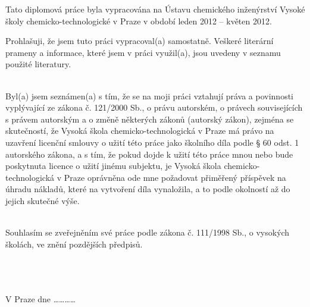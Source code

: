 \noindent Tato diplomová práce byla vypracována na Ústavu chemického inženýrství Vysoké školy chemicko-technologické v Praze v období leden 2012 -- květen 2012.

\vspace{11cm}
\noindent Prohlašuji, že jsem tuto práci vypracoval(a) samostatně. Veškeré literární prameny a informace, které jsem v práci využil(a), jsou uvedeny v seznamu použité literatury.

~\\
\noindent Byl(a) jsem seznámen(a) s tím, že se na moji práci vztahují práva a povinnosti vyplývající ze zákona č. 121/2000 Sb., o právu autorském, o právech souvisejících s právem autorským a o změně některých zákonů (autorský zákon), zejména se skutečností, že Vysoká škola chemicko-technologická v Praze má právo na uzavření licenční smlouvy o užití této práce jako školního díla podle § 60 odst. 1 autorského zákona, a s tím, že pokud dojde k užití této práce mnou nebo bude poskytnuta licence o užití jinému subjektu, je Vysoká škola chemicko-technologická v Praze oprávněna ode mne požadovat přiměřený příspěvek na úhradu nákladů, které na vytvoření díla vynaložila, a to podle okolností až do jejich skutečné výše.

~\\
\noindent Souhlasím se zveřejněním své práce podle zákona č. 111/1998 Sb., o vysokých školách, ve znění pozdějších předpisů.

~\\
~\\
~\\
\noindent V Praze dne \ldots\ldots\ldots\ldots

